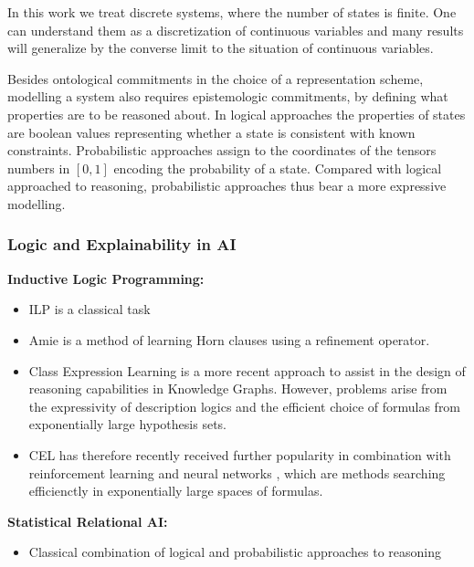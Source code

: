 In this work we treat discrete systems, where the number of states is finite.
One can understand them as a discretization of continuous variables and many results will generalize by the converse limit to the situation of continuous variables.

Besides ontological commitments in the choice of a representation scheme, modelling a system also requires epistemologic commitments, by defining what properties are to be reasoned about.
In logical approaches the properties of states are boolean values representing whether a state is consistent with known constraints.
Probabilistic approaches assign to the coordinates of the tensors numbers in $[0,1]$ encoding the probability of a state.
Compared with logical approached to reasoning, probabilistic approaches thus bear a more expressive modelling.

\subsubsection{Logic and Explainability in AI}

\textbf{Inductive Logic Programming:}
\begin{itemize}
    \item ILP is a classical task \cite{muggleton_inductive_1994}
    \item Amie \cite{galarraga_amie_2013} is a method of learning Horn clauses using a refinement operator.
    \item Class Expression Learning \cite{lehmann_class_2011} is a more recent approach to assist in the design of reasoning capabilities in Knowledge Graphs.
        However, problems arise from the expressivity of description logics and the efficient choice of formulas from exponentially large hypothesis sets.
    \item CEL has therefore recently received further popularity in combination with reinforcement learning \cite{demir_drill-_2021} and neural networks \cite{kouagou_neural_2022, pesquita_neural_2023}, which are methods searching efficienctly in exponentially large spaces of formulas.
\end{itemize}

\textbf{Statistical Relational AI:} \cite{getoor_introduction_2019}
\begin{itemize}
    \item Classical combination of logical and probabilistic approaches to reasoning
\end{itemize}

